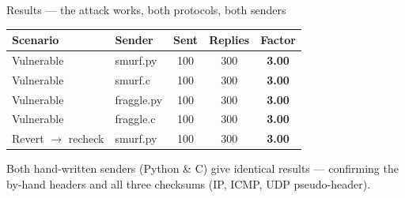 \documentclass[aspectratio=169,10pt]{beamer}
\newcommand{\code}[1]{{\ttfamily #1}}
\begin{document}
\begin{frame}{Results — the attack works, both protocols, both senders}
  \centering
  \small
  \begin{tabular}{@{}llccc@{}}
    \toprule
    \textbf{Scenario} & \textbf{Sender} & \textbf{Sent} & \textbf{Replies} & \textbf{Factor}\\
    \midrule
    Vulnerable & \code{smurf.py}   & 100 & 300 & \textbf{3.00}\\
    Vulnerable & \code{smurf.c}    & 100 & 300 & \textbf{3.00}\\
    Vulnerable & \code{fraggle.py} & 100 & 300 & \textbf{3.00}\\
    Vulnerable & \code{fraggle.c}  & 100 & 300 & \textbf{3.00}\\
    Revert $\rightarrow$ recheck & \code{smurf.py} & 100 & 300 & \textbf{3.00}\\
    \bottomrule
  \end{tabular}

  \vspace{6pt}
  \footnotesize Both hand-written senders (Python \& C) give identical results —
  confirming the by-hand headers and all three checksums (IP, ICMP, UDP pseudo-header).
\end{frame}

\end{document}
